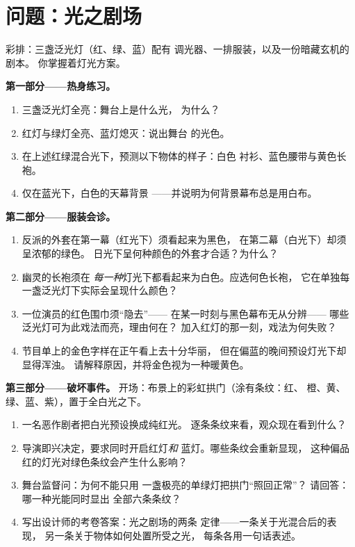 \section{问题：光之剧场}

\begin{problem}\label{pb:g8:colors-spectra:1}
彩排：三盏泛光灯（红、绿、蓝）配有
调光器、一排服装，以及一份暗藏玄机的剧本。
你掌握着灯光方案。

\medskip\noindent\textbf{第一部分——热身练习。}
\begin{enumerate}
  \item 三盏泛光灯全亮：舞台上是什么光，
        为什么？
  \item 红灯与绿灯全亮、蓝灯熄灭：说出舞台
        的光色。
  \item 在上述红绿混合光下，预测以下物体的样子：白色
        衬衫、蓝色腰带与黄色长袍。
  \item 仅在蓝光下，白色的天幕背景
        ——并说明为何背景幕布总是用白布。
\end{enumerate}

\medskip\noindent\textbf{第二部分——服装会诊。}
\begin{enumerate}[resume]
  \item 反派的外套在第一幕（红光下）须看起来为黑色，
        在第二幕（白光下）却须呈浓郁的绿色。
        日光下呈何种颜色的外套才合适？为什么？
  \item 幽灵的长袍须在
        \emph{每一种}灯光下都看起来为白色。应选何色长袍，
        它在单独每一盏泛光灯下实际会呈现什么颜色？
  \item 一位演员的红色围巾须“隐去”——
        在某一时刻与黑色幕布无从分辨——
        哪些泛光灯可为此戏法而亮，理由何在？
        加入红灯的那一刻，戏法为何失败？
  \item 节目单上的金色字样在正午看上去十分华丽，
        但在偏蓝的晚间预设灯光下却显得浑浊。
        请解释原因，并将金色视为一种暖黄色。
\end{enumerate}

\medskip\noindent\textbf{第三部分——破坏事件。}
开场：布景上的彩虹拱门（涂有条纹：红、
橙、黄、绿、蓝、紫），置于全白光之下。
\begin{enumerate}[resume]
  \item 一名恶作剧者把白光预设换成纯红光。
        逐条条纹来看，观众现在看到什么？
  \item 导演即兴决定，要求同时开启红灯\emph{和}
        蓝灯。哪些条纹会重新显现，
        这种偏品红的灯光对绿色条纹会产生什么影响？
  \item 舞台监督问：为何不能只用
        一盏极亮的单绿灯把拱门“照回正常”？
        请回答：哪一种光能同时显出
        全部六条条纹？
  \item 写出设计师的考卷答案：光之剧场的两条
        定律——一条关于光混合后的表现，
        另一条关于物体如何处置所受之光，
        每条各用一句话表述。
\end{enumerate}
\end{problem}
